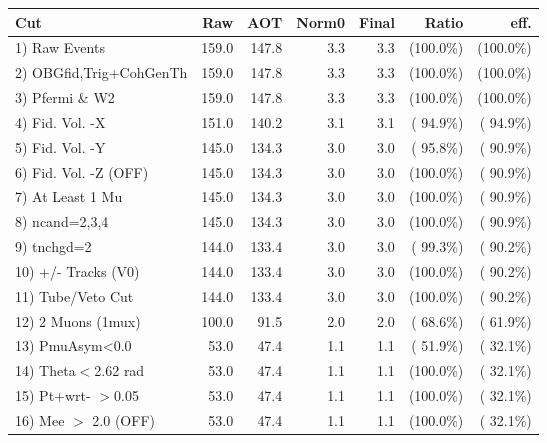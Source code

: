  \begin{table}[h!]\centering
 \begin{tabular}{||l||r|r|r|r|r|r||}
 \hline
 \hline
 Cut & Raw & AOT & Norm0 & Final & Ratio & eff.       \\
 \hline
  1) Raw Events           &        159.0 &        147.8 &          3.3 &          3.3 & (100.0\%) & (100.0\%) \\
  2) OBGfid,Trig+CohGenTh &        159.0 &        147.8 &          3.3 &          3.3 & (100.0\%) & (100.0\%) \\
  3) Pfermi \& W2         &        159.0 &        147.8 &          3.3 &          3.3 & (100.0\%) & (100.0\%) \\
  4) Fid. Vol. -X         &        151.0 &        140.2 &          3.1 &          3.1 & ( 94.9\%) & ( 94.9\%) \\
  5) Fid. Vol. -Y         &        145.0 &        134.3 &          3.0 &          3.0 & ( 95.8\%) & ( 90.9\%) \\
  6) Fid. Vol. -Z (OFF)   &        145.0 &        134.3 &          3.0 &          3.0 & (100.0\%) & ( 90.9\%) \\
  7) At Least 1 Mu        &        145.0 &        134.3 &          3.0 &          3.0 & (100.0\%) & ( 90.9\%) \\
  8) ncand=2,3,4          &        145.0 &        134.3 &          3.0 &          3.0 & (100.0\%) & ( 90.9\%) \\
  9) tnchgd=2             &        144.0 &        133.4 &          3.0 &          3.0 & ( 99.3\%) & ( 90.2\%) \\
 10) +/- Tracks (V0)      &        144.0 &        133.4 &          3.0 &          3.0 & (100.0\%) & ( 90.2\%) \\
 11) Tube/Veto Cut        &        144.0 &        133.4 &          3.0 &          3.0 & (100.0\%) & ( 90.2\%) \\
 12) 2 Muons (1mux)       &        100.0 &         91.5 &          2.0 &          2.0 & ( 68.6\%) & ( 61.9\%) \\
 13) PmuAsym<0.0          &         53.0 &         47.4 &          1.1 &          1.1 & ( 51.9\%) & ( 32.1\%) \\
 14) Theta$<$2.62 rad     &         53.0 &         47.4 &          1.1 &          1.1 & (100.0\%) & ( 32.1\%) \\
 15) Pt+wrt- $>$0.05      &         53.0 &         47.4 &          1.1 &          1.1 & (100.0\%) & ( 32.1\%) \\
 16) Mee $>$ 2.0  (OFF)   &         53.0 &         47.4 &          1.1 &          1.1 & (100.0\%) & ( 32.1\%) \\

\end{tabular}
\end{table}
